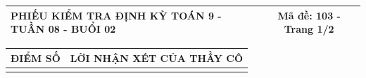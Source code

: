 \documentclass[12pt,a4paper]{article}
\begin{document}
\newpage

\noindent
\begin{tabularx}{\linewidth}{|X|c|}
\hline
\textbf{PHIẾU KIỂM TRA ĐỊNH KỲ TOÁN 9 - TUẦN 08 - BUỔI 02} & \textbf{Mã đề: 103 - Trang 1/2} \\
\hline
\end{tabularx}

\vspace{1.0mm}

\noindent
\begin{tabularx}{\linewidth}{|p{3.2cm}|X|}
\hline
\centering\textbf{ĐIỂM SỐ} & \centering\textbf{LỜI NHẬN XÉT CỦA THẦY CÔ} \tabularnewline
\hline
\rule{0pt}{1.8cm} & \tabularnewline
\hline
\end{tabularx}
\end{document}
